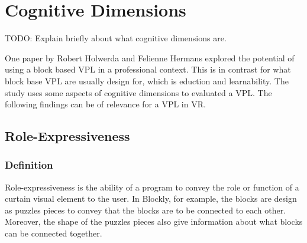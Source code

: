 \documentclass{sigchi}
\begin{document}
\section{Cognitive Dimensions}
TODO: Explain briefly about what cognitive dimensions are.





One paper by Robert Holwerda and Felienne Hermans explored the potential of using a block based VPL in a professional context. This is in contrast for what block base VPL are usually design for, which is eduction and learnability. The study uses some aspects of cognitive dimensions to evaluated a VPL. The following findings can be of relevance for a VPL in VR.

\subsection{Role-Expressiveness}
\subsubsection{Definition}
Role-expressiveness is the ability of a program to convey the role or function of a curtain visual element to the user. In Blockly, for example, the blocks are design as puzzles pieces to convey that the blocks are to be connected to each other. Moreover, the shape of the puzzles pieces also give information about what blocks can be connected together.
\end{document}
